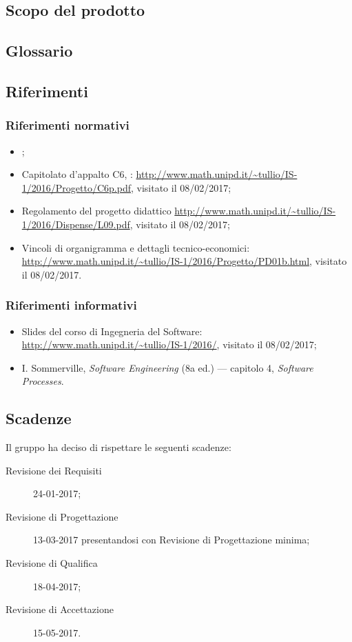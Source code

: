 \subsection{Scopo del prodotto}
\scopo

\subsection{Glossario}
\presgloss

\subsection{Riferimenti}
\subsubsection{Riferimenti normativi}
\begin{itemize}
	\item \NdP;
	\item Capitolato d'appalto C6, \proj: \url{http://www.math.unipd.it/~tullio/IS-1/2016/Progetto/C6p.pdf}, visitato il 08/02/2017;
	\item Regolamento del progetto didattico \url{http://www.math.unipd.it/~tullio/IS-1/2016/Dispense/L09.pdf}, visitato il 08/02/2017;
	\item Vincoli di organigramma e dettagli tecnico-economici: \url{http://www.math.unipd.it/~tullio/IS-1/2016/Progetto/PD01b.html}, visitato il 08/02/2017.
\end{itemize}
\subsubsection{Riferimenti informativi} \label{sec:ref}
\begin{itemize}
	\item Slides del corso di Ingegneria del Software: \url{http://www.math.unipd.it/~tullio/IS-1/2016/}, visitato il 08/02/2017;
	\item I. Sommerville, \emph{Software Engineering} (8a ed.) --- capitolo 4, \emph{Software Processes}.
\end{itemize}

\subsection{Scadenze}
Il gruppo \hx{} ha deciso di rispettare le seguenti scadenze:
\begin{description}
	\item[Revisione dei Requisiti] 24-01-2017;
	\item[Revisione di Progettazione] 13-03-2017 presentandosi con Revisione di Progettazione minima;
	\item[Revisione di Qualifica] 18-04-2017;
	\item[Revisione di Accettazione] 15-05-2017.
\end{description}





